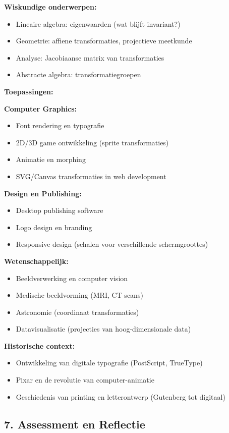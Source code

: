 \documentclass{ximera}
\begin{document}
\textbf{Wiskundige onderwerpen:}
\begin{itemize}
\item Lineaire algebra: eigenwaarden (wat blijft invariant?)
\item Geometrie: affiene transformaties, projectieve meetkunde
\item Analyse: Jacobiaanse matrix van transformaties
\item Abstracte algebra: transformatiegroepen
\end{itemize}

\textbf{Toepassingen:}

\textbf{Computer Graphics:}
\begin{itemize}
\item Font rendering en typografie
\item 2D/3D game ontwikkeling (sprite transformaties)
\item Animatie en morphing
\item SVG/Canvas transformaties in web development
\end{itemize}

\textbf{Design en Publishing:}
\begin{itemize}
\item Desktop publishing software
\item Logo design en branding
\item Responsive design (schalen voor verschillende schermgroottes)
\end{itemize}

\textbf{Wetenschappelijk:}
\begin{itemize}
\item Beeldverwerking en computer vision
\item Medische beeldvorming (MRI, CT scans)
\item Astronomie (coordinaat transformaties)
\item Datavisualisatie (projecties van hoog-dimensionale data)
\end{itemize}

\textbf{Historische context:}
\begin{itemize}
\item Ontwikkeling van digitale typografie (PostScript, TrueType)
\item Pixar en de revolutie van computer-animatie
\item Geschiedenis van printing en letterontwerp (Gutenberg tot digitaal)
\end{itemize}

\subsection*{7. Assessment en Reflectie}
\end{document}
